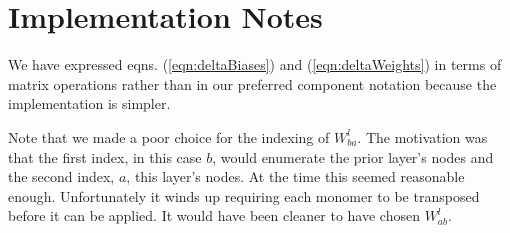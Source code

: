 \documentclass[twocolumn]{revtex4-1}
\begin{document}
\section{Implementation Notes}
We have expressed eqns. (\ref{eqn:deltaBiases}) and (\ref{eqn:deltaWeights}) in terms of matrix operations rather than in our preferred component notation because the implementation is simpler.

Note that we made a poor choice for the indexing of $W^l_{b a}$. The motivation was that the first index, in this case $b$, would enumerate the prior layer's nodes and the second index, $a$, this layer's nodes. At the time this seemed reasonable enough. Unfortunately it winds up requiring each monomer to be transposed before it can be applied. It would have been cleaner to have chosen $W^l_{a b}$.
\end{document}
